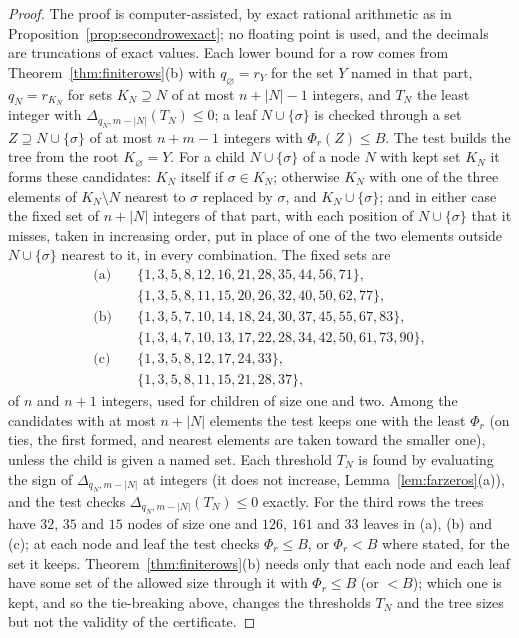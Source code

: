 \documentclass[11pt]{article}
\begin{document}
\begin{proof}
The proof is computer-assisted, by exact rational arithmetic as in
Proposition~\ref{prop:secondrowexact}; no floating point is
used, and the decimals are truncations of exact values.  Each lower bound for a row comes from
Theorem~\ref{thm:finiterows}(b) with $q_\varnothing=r_Y$ for the set $Y$
named in that part, $q_N=r_{K_N}$ for sets $K_N\supseteq N$ of at most
$n+|N|-1$ integers, and $T_N$ the least integer with
$\Delta_{q_N,m-|N|}(T_N)\le0$; a leaf $N\cup\{\sigma\}$ is checked through a
set $Z\supseteq N\cup\{\sigma\}$ of at most $n+m-1$ integers with
$\Phi_r(Z)\le B$.  The test builds the tree from the root
$K_\varnothing=Y$.  For a child $N\cup\{\sigma\}$ of a node $N$ with kept
set $K_N$ it forms these candidates: $K_N$ itself if $\sigma\in K_N$;
otherwise $K_N$ with one of the three elements of $K_N\setminus N$ nearest
to $\sigma$ replaced by $\sigma$, and $K_N\cup\{\sigma\}$; and in either
case the fixed set of $n+|N|$ integers of that part, with each position of
$N\cup\{\sigma\}$ that it misses, taken in increasing order, put in place of
one of the two elements outside $N\cup\{\sigma\}$ nearest to it, in every
combination.  The fixed sets are
\begin{align*}
  \text{(a)}\quad&\{1,3,5,8,12,16,21,28,35,44,56,71\},\\
  &\{1,3,5,8,11,15,20,26,32,40,50,62,77\},\\
  \text{(b)}\quad&\{1,3,5,7,10,14,18,24,30,37,45,55,67,83\},\\
  &\{1,3,4,7,10,13,17,22,28,34,42,50,61,73,90\},\\
  \text{(c)}\quad&\{1,3,5,8,12,17,24,33\},\\
  &\{1,3,5,8,11,15,21,28,37\},
\end{align*}
of $n$ and $n+1$ integers, used for children of size one and two.  Among
the candidates with at most $n+|N|$ elements the test keeps one with the
least $\Phi_r$ (on ties, the first formed, and nearest elements are taken
toward the smaller one), unless the child is given a named set.  Each
threshold $T_N$ is found by evaluating the sign of $\Delta_{q_N,m-|N|}$ at
integers (it does not increase, Lemma~\ref{lem:farzeros}(a)), and the test
checks $\Delta_{q_N,m-|N|}(T_N)\le0$ exactly.  For the third rows the trees
have $32$, $35$ and $15$ nodes of size one and $126$, $161$ and $33$ leaves
in (a), (b) and (c); at each node and leaf the test checks $\Phi_r\le B$,
or $\Phi_r<B$ where stated, for the set it keeps.  Theorem~\ref{thm:finiterows}(b)
needs only that each node and each leaf have some set of the allowed size
through it with $\Phi_r\le B$ (or $<B$); which one is kept, and so the
tie-breaking above, changes the thresholds $T_N$ and the tree sizes but not
the validity of the certificate.


\end{proof}
\end{document}

